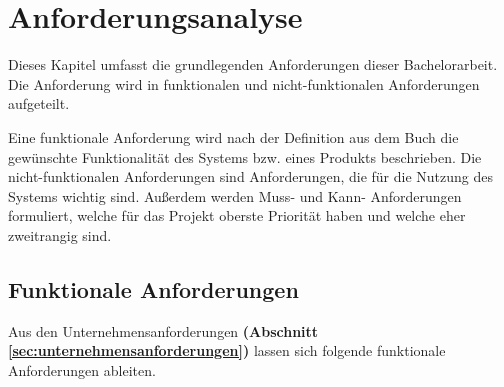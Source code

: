 \section{Anforderungsanalyse}
\label{sec:anforderungsanalyse}
Dieses Kapitel umfasst die grundlegenden Anforderungen dieser Bachelorarbeit. Die Anforderung wird in funktionalen und nicht-funktionalen Anforderungen aufgeteilt.\bigskip

Eine funktionale Anforderung wird nach der Definition aus dem Buch \cite{Balzert2010} die gewünschte Funktionalität des Systems bzw. eines Produkts beschrieben. Die nicht-funktionalen Anforderungen sind Anforderungen, die für die Nutzung des Systems wichtig sind. Außerdem werden Muss- und Kann- Anforderungen formuliert, welche für das Projekt oberste Priorität haben und welche eher zweitrangig sind.

\subsection{Funktionale Anforderungen}
\label{sec:funktionale anforderungen}
Aus den Unternehmensanforderungen \textbf{(Abschnitt \ref{sec:unternehmensanforderungen})} lassen sich folgende funktionale Anforderungen ableiten.

